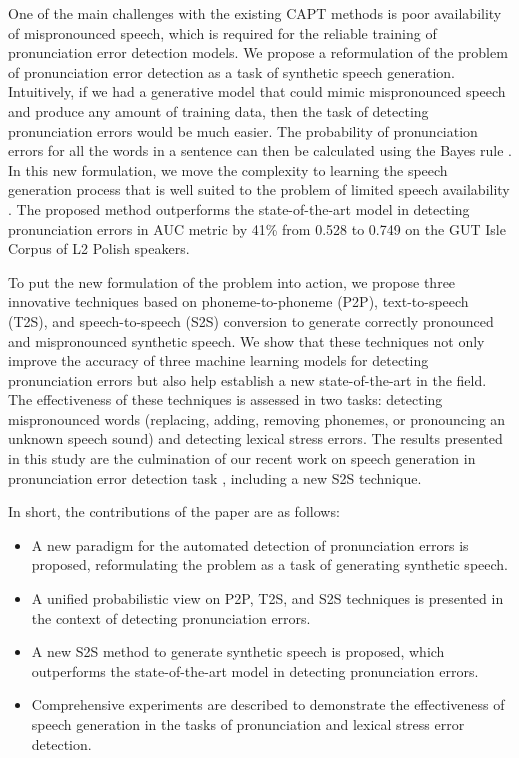 \documentclass[]{interact}
\theoremstyle{plain}%
\theoremstyle{definition}
\theoremstyle{remark}
\begin{document}
One of the main challenges with the existing CAPT methods is poor availability of mispronounced speech, which is required for the reliable training of pronunciation error detection models. We propose a reformulation of the problem of pronunciation error detection as a task of synthetic speech generation. Intuitively, if we had a generative model that could mimic mispronounced speech and produce any amount of training data, then the task of detecting pronunciation errors would be much easier. The probability of pronunciation errors for all the words in a sentence can then be calculated using the Bayes rule \cite{bishop2006pattern}. In this new formulation, we move the complexity to learning the speech generation process that is well suited to the problem of limited speech availability \cite{huybrechts2021low, shah21_ssw, fazel21_interspeech}. The proposed method outperforms the state-of-the-art model \cite{leung2019cnn} in detecting pronunciation errors in AUC metric by 41\% from 0.528 to 0.749 on the GUT Isle Corpus of L2 Polish speakers. 

To put the new formulation of the problem into action, we propose three innovative techniques based on phoneme-to-phoneme (P2P), text-to-speech (T2S), and speech-to-speech (S2S) conversion to generate correctly pronounced and mispronounced synthetic speech. We show that these techniques not only improve the accuracy of three machine learning models for detecting pronunciation errors but also help establish a new state-of-the-art in the field. The effectiveness of these techniques is assessed in two tasks: detecting mispronounced words (replacing, adding, removing phonemes, or pronouncing an unknown speech sound) and detecting lexical stress errors. The results presented in this study are the culmination of our recent work on speech generation in pronunciation error detection task \cite{korzekwa2021mispronunciation,korzekwa21b_interspeech,korzekwa21_interspeech}, including a new S2S technique.

In short, the contributions of the paper are as follows:
\begin{itemize}
\item A new paradigm for the automated detection of pronunciation errors is proposed, reformulating the problem as a task of generating synthetic speech.
\item A unified probabilistic view on P2P, T2S, and S2S techniques is presented in the context of detecting pronunciation errors.
\item A new S2S method to generate synthetic speech is proposed, which outperforms the state-of-the-art model \cite{leung2019cnn} in detecting pronunciation errors.
\item Comprehensive experiments are described to demonstrate the effectiveness of speech generation in the tasks of pronunciation and lexical stress error detection.
\end{itemize}
\end{document}
